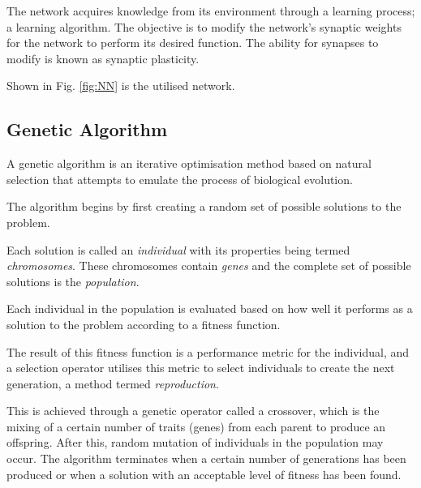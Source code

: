 The network acquires knowledge from its environment through a learning process; a learning algorithm. The objective is to modify the network’s synaptic weights for the network to perform its desired function. The ability for synapses to modify is known as synaptic plasticity. \cite{Haykin2008}

Shown in Fig. \ref{fig:NN} is the utilised network.


\subsection{Genetic Algorithm}

A genetic algorithm is an iterative optimisation method based on natural selection that attempts to emulate the process of biological evolution. \cite{Fraser1970}

The algorithm begins by first creating a random set of possible solutions to the problem.

Each solution is called an \textit{individual} with its properties being termed \textit{chromosomes}. These chromosomes contain \textit{genes} and the complete set of possible solutions is the \textit{population}. 

Each individual in the population is evaluated based on how well it performs as a solution to the problem according to a fitness function. 

The result of this fitness function is a performance metric for the individual, and a selection operator utilises this metric to select individuals to create the next generation, a method termed \textit{reproduction}.

This is achieved through a genetic operator called a crossover, which is the mixing of a certain number of traits (genes) from each parent to produce an offspring. After this, random mutation of individuals in the population may occur. The algorithm terminates when a certain number of generations has been produced or when a solution with an acceptable level of fitness has been found. 

